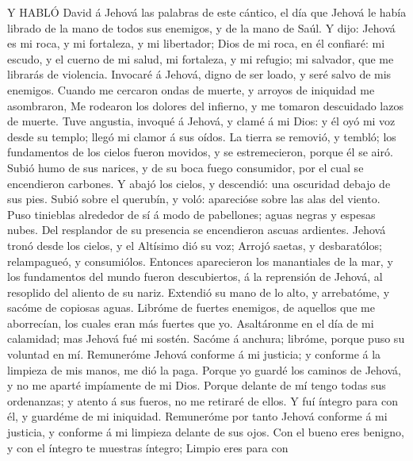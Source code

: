  Y HABLÓ David á Jehová las palabras de este cántico, el día
que Jehová le había librado de la mano de todos sus enemigos, y de la
mano de Saúl.  Y dijo: Jehová es mi roca, y mi fortaleza, y
mi libertador;  Dios de mi roca, en él confiaré: mi escudo,
y el cuerno de mi salud, mi fortaleza, y mi refugio; mi salvador, que me
librarás de violencia.  Invocaré á Jehová, digno de ser
loado, y seré salvo de mis enemigos.  Cuando me cercaron
ondas de muerte, y arroyos de iniquidad me asombraron,  Me
rodearon los dolores del infierno, y me tomaron descuidado lazos de
muerte.  Tuve angustia, invoqué á Jehová, y clamé á mi Dios:
y él oyó mi voz desde su templo; llegó mi clamor á sus oídos.
 La tierra se removió, y tembló; los fundamentos de los
cielos fueron movidos, y se estremecieron, porque él se airó.
 Subió humo de sus narices, y de su boca fuego consumidor,
por el cual se encendieron carbones.  Y abajó los cielos, y
descendió: una oscuridad debajo de sus pies.  Subió sobre
el querubín, y voló: aparecióse sobre las alas del viento. 
Puso tinieblas alrededor de sí á modo de pabellones; aguas negras y
espesas nubes.  Del resplandor de su presencia se
encendieron ascuas ardientes.  Jehová tronó desde los
cielos, y el Altísimo dió su voz;  Arrojó saetas, y
desbaratólos; relampagueó, y consumiólos.  Entonces
aparecieron los manantiales de la mar, y los fundamentos del mundo
fueron descubiertos, á la reprensión de Jehová, al resoplido del aliento
de su nariz.  Extendió su mano de lo alto, y arrebatóme, y
sacóme de copiosas aguas.  Libróme de fuertes enemigos, de
aquellos que me aborrecían, los cuales eran más fuertes que yo.
 Asaltáronme en el día de mi calamidad; mas Jehová fué mi
sostén.  Sacóme á anchura; libróme, porque puso su voluntad
en mí.  Remuneróme Jehová conforme á mi justicia; y
conforme á la limpieza de mis manos, me dió la paga. 
Porque yo guardé los caminos de Jehová, y no me aparté impíamente de mi
Dios.  Porque delante de mí tengo todas sus ordenanzas; y
atento á sus fueros, no me retiraré de ellos.  Y fuí
íntegro para con él, y guardéme de mi iniquidad. 
Remuneróme por tanto Jehová conforme á mi justicia, y conforme á mi
limpieza delante de sus ojos.  Con el bueno eres benigno, y
con el íntegro te muestras íntegro;  Limpio eres para con
